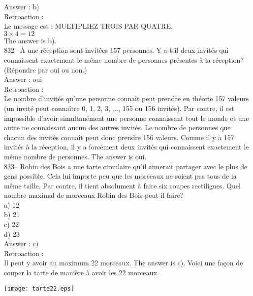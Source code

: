 ﻿\documentclass[letterpaper, 12pt]{article}
\begin{document}
Answer : b)\\

Retroaction : \\
Le message est : \og MULTIPLIEZ TROIS PAR QUATRE\fg.\\
$3\times4=12$\\
The answer is b).\\


832-- \`A une r\'eception sont invit\'ees 157 personnes.  Y a-t-il deux
invit\'es qui connaissent exactement le m\^eme nombre de personnes
pr\'esentes \`a la r\'eception? (R\'epondre par oui ou non.)\\

Answer : oui\\

Retroaction : \\
Le nombre d'invit\'es qu'une personne conna\^it peut prendre en th\'eorie
157 valeurs (un invit\'e peut conna\^itre 0, 1, 2, 3, $\ldots$, 155 ou 156
invit\'es).  Par contre, il est impossible d'avoir simultan\'ement une
personne connaissant tout le monde et une autre ne connaissant aucun des
autres invit\'es.  Le nombre de personnes que chacun des invit\'es conna\^it
peut donc prendre 156 valeurs.  Comme il y a 157 invit\'es \`a la
r\'eception, il y a forc\'ement deux invit\'es qui connaissent exactement le
m\^eme nombre de personnes.  The answer is oui.\\

833-- Robin des Bois a une tarte circulaire qu'il aimerait partager avec le
plus de gens possible.  Cela lui importe peu que les morceaux ne soient pas
tous de la m\^eme taille.  Par contre, il tient absolument \`a faire six
coupes rectilignes.  Quel nombre maximal de morceaux Robin des Bois peut-il
faire?\\
a) 12\\
b) 21\\
c) 22\\
d) 23\\

Answer : c)\\

Retroaction : \\
Il peut y avoir au maximum 22 morceaux.  The answer is c).  Voici une
fa\c con de couper la tarte de mani\`ere \`a avoir les 22 morceaux.\\
    \begin{center}
    \texttt{[image: tarte22.eps]}
    \end{center}
\end{document}
